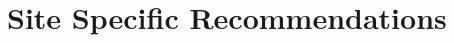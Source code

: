 \section{Site Specific Recommendations}

\DTLsetseparator{///}

\begin{table}[htbp]
\centering
\begin{tabular}
 

 \renewcommand{\dtlheaderformat}{ \rowcolor{lhitabletitle}\color{white}\normalfont\Large\bfseries}
 
\end{tabular}
\end{table}


